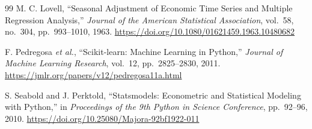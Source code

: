 \begin{thebibliography}{99}
M. C. Lovell, ``Seasonal Adjustment of Economic Time Series and Multiple Regression Analysis,'' \emph{Journal of the American Statistical Association}, vol.~58, no.~304, pp.~993--1010, 1963. \url{https://doi.org/10.1080/01621459.1963.10480682}

F. Pedregosa \emph{et al.}, ``Scikit-learn: Machine Learning in Python,'' \emph{Journal of Machine Learning Research}, vol.~12, pp.~2825--2830, 2011. \url{https://jmlr.org/papers/v12/pedregosa11a.html}

S. Seabold and J. Perktold, ``Statsmodels: Econometric and Statistical Modeling with Python,'' in \emph{Proceedings of the 9th Python in Science Conference}, pp.~92--96, 2010. \url{https://doi.org/10.25080/Majora-92bf1922-011}

\end{thebibliography}
